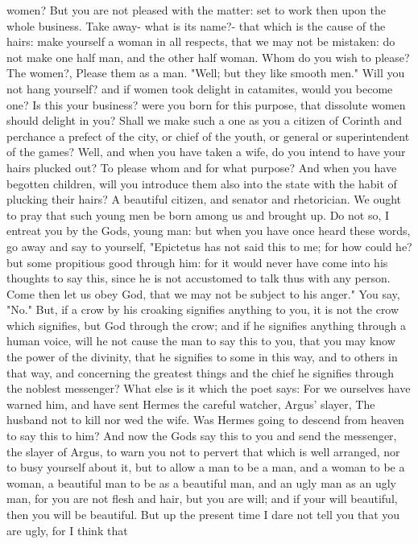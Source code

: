 \documentclass[a4paper]{article}
\begin{document}
women? But you are not pleased with the matter: set to work then upon the whole
business. Take away- what is its name?- that which is the cause of the hairs:
make yourself a woman in all respects, that we may not be mistaken: do not make
one half man, and the other half woman. Whom do you wish to please? The women?,
Please them as a man. "Well; but they like smooth men." Will you not hang
yourself? and if women took delight in catamites, would you become one? Is this
your business? were you born for this purpose, that dissolute women should
delight in you? Shall we make such a one as you a citizen of Corinth and
perchance a prefect of the city, or chief of the youth, or general or
superintendent of the games? Well, and when you have taken a wife, do you
intend to have your hairs plucked out? To please whom and for what purpose? And
when you have begotten children, will you introduce them also into the state
with the habit of plucking their hairs? A beautiful citizen, and senator and
rhetorician. We ought to pray that such young men be born among us and brought
up.
    Do not so, I entreat you by the Gods, young man: but when you have once
heard these words, go away and say to yourself, "Epictetus has not said this to
me; for how could he? but some propitious good through him: for it would never
have come into his thoughts to say this, since he is not accustomed to talk
thus with any person. Come then let us obey God, that we may not be subject to
his anger." You say, "No." But, if a crow by his croaking signifies anything to
you, it is not the crow which signifies, but God through the crow; and if he
signifies anything through a human voice, will he not cause the man to say this
to you, that you may know the power of the divinity, that he signifies to some
in this way, and to others in that way, and concerning the greatest things and
the chief he signifies through the noblest messenger? What else is it which the
poet says:
       For we ourselves have warned him, and have sent
       Hermes the careful watcher, Argus' slayer,
       The husband not to kill nor wed the wife.
    Was Hermes going to descend from heaven to say this to him? And now the
Gods say this to you and send the messenger, the slayer of Argus, to warn you
not to pervert that which is well arranged, nor to busy yourself about it, but
to allow a man to be a man, and a woman to be a woman, a beautiful man to be as
a beautiful man, and an ugly man as an ugly man, for you are not flesh and
hair, but you are will; and if your will beautiful, then you will be beautiful.
But up the present time I dare not tell you that you are ugly, for I think that
\end{document}
